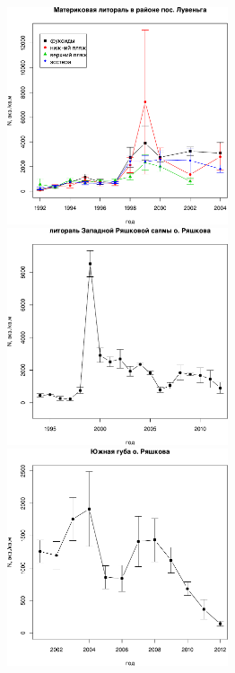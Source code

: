 \begin{figure}[p]
\begin{minipage}[b]{.46\linewidth}
\begin{center}
		\includegraphics[width=65mm]{../White_Sea//Luvenga_II_razrez/N2_dynamic1.pdf}
	\end{center}
	\end{minipage}
%
	\hfil %
%
	\begin{minipage}[b]{.46\linewidth}
	\begin{center}
		\includegraphics[width=65mm]{../White_Sea/Ryashkov_ZRS/N2_dynamic1.pdf}
	\end{center}
	\end{minipage}
	\begin{minipage}[b]{.46\linewidth}
	\begin{center}
		\includegraphics[width=65mm]{../White_Sea/Ryashkov_YuG/N2_dynamic1.pdf}

\end{center}
\end{minipage}
\end{figure}
